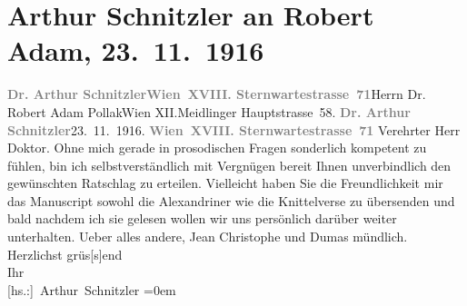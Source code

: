 

         
         \renewcommand{\erwaehntePersonen}{Personen: Robert Adam, Alexandre père Dumas}
         \renewcommand{\erwaehnteOrte}{Orte: Meidlinger Hauptstraße, Sternwartestraße, Wien, XII., Meidling}
         \renewcommand{\erwaehnteWerke}{Werke: Jean Christophe, Meine Memoiren, Wundervogel}
               \section[Arthur Schnitzler an Robert Adam, 23. 11. 1916]{ Arthur Schnitzler an Robert Adam, 23. 11. 1916}\nopagebreak{}\rehead{ }\begin{ledgroupsized}[t]{13cm}\normalsize\beginnumbering \toendnotes[C]{\smallbreak\pagebreak[2]} 
\toendnotes[C]{\smallbreak}\pstart{}{\pb}\textcolor{gray}{\textbf{Dr. Arthur Schnitzler}}\pend{}\pstart{}\textcolor{gray}{\textbf{Wien XVIII. Sternwartestrasse 71}}\pend{}{\bigskip}\pstart{}{\pb}Herrn Dr. Robert Adam Pollak\pend{}\pstart{}Wien XII.\pend{}\pstart{}Meidlinger Hauptstrasse 58.\pend{}{\bigskip}\pstart
           \noindent{}{\pb}\textcolor{gray}{\textbf{Dr. Arthur Schnitzler}}\hfill 23. 11. 1916.\pend
           \pstart
           \textcolor{gray}{\textbf{Wien XVIII. Sternwartestrasse 71}}\pend
           \pstart\center{}Verehrter Herr Doktor.\pend\pstart
           Ohne mich gerade in prosodischen Fragen sonderlich kompetent zu fühlen, bin ich
                    selbstverständlich mit Vergnügen bereit Ihnen unverbindlich den gewünschten
                    Ratschlag zu erteilen. Vielleicht haben Sie die Freundlichkeit mir das Manuscript sowohl die
                    Alexandriner wie die Knittelverse zu übersenden und bald nachdem ich sie gelesen
                    wollen wir uns persönlich darüber weiter unterhalten. Ueber alles andere, Jean Christophe und Dumas mündlich.\pend
           \pstart
           Herzlichst grüs{[}s{]}end{\\[\baselineskip]}Ihr{\\[\baselineskip]}\spacefill\mbox{{[}hs.:{]} Arthur Schnitzler}\pend
           \leftskip=0em{}
         

\end{ledgroupsized}
